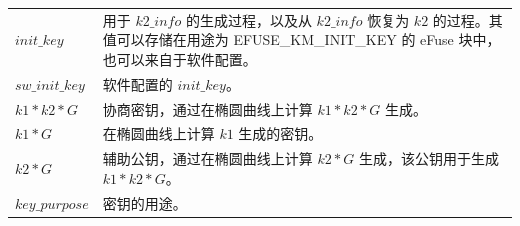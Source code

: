\documentclass[main\_\_CN.tex]{subfiles}
\begin{document}
\begin{longtable}[c]{ R{6cm} p{10cm} }
\begin{math}init\_key\end{math}\label{para:initkey} & 用于 \begin{math}k2\_info\end{math} 的生成过程，以及从 \begin{math}k2\_info\end{math} 恢复为 \begin{math}k2\end{math} 的过程。其值可以存储在用途为 EFUSE\_KM\_INIT\_KEY 的 eFuse 块中，也可以来自于软件配置。\\
\textbf{\begin{math}sw\_init\_key\end{math}}\label{para:swinitkey} & 软件配置的 \begin{math}init\_key\end{math}。\\
\textbf{\begin{math}k1*k2*G\end{math}}\label{para:k1k2G} & 协商密钥，通过在椭圆曲线上计算 \begin{math}k1*k2*G\end{math} 生成。\\
\textbf{\begin{math}k1*G\end{math}}\label{para:k1G} & 在椭圆曲线上计算 \begin{math}k1\end{math} 生成的密钥。\\
\textbf{\begin{math}k2*G\end{math}}\label{para:k2G} & 辅助公钥，通过在椭圆曲线上计算 \begin{math}k2*G\end{math} 生成，该公钥用于生成 \begin{math}k1*k2*G\end{math}。\\
\textbf{\begin{math}key\_purpose\end{math}} & 密钥的用途。\\
\end{longtable}
\end{document}
